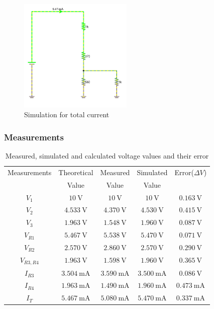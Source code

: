 \documentclass[letterpaper]{article}
\begin{document}
    \begin{figure}
    \centering
        \includegraphics[width=0.48\textwidth]{sims/Itot}
        \caption{Simulation for total current}
    \end{figure}
\subsubsection{Measurements}
\begin{table}[H]
    \centering
    \begin{tabular}{|c|c|c|c|c|}
    \hline
    Measurements & Theoretical & Measured & Simulated & Error($\Delta V$)\\
    & Value & Value & Value & \\\hline
    $V_1$ & $\SI{10}{\volt}$ & $\SI{10}{\volt}$ & $\SI{10}{\volt}$ & $\SI{0.163}{\volt}$\\\hline
    $V_2$ & $\SI{4.533}{\volt}$ & $\SI{4.370}{\volt}$ & $\SI{4.530}{\volt}$ & $\SI{0.415}{\volt}$\\\hline
    $V_3$ & $\SI{1.963}{\volt}$ & $\SI{1.548}{\volt}$ & $\SI{1.960}{\volt}$ & $\SI{0.087}{\volt}$\\\hline
    $V_{R1}$ & $\SI{5.467}{\volt}$ & $\SI{5.538}{\volt}$ & $\SI{5.470}{\volt}$ & $\SI{0.071}{\volt}$\\\hline
    $V_{R2}$ & $\SI{2.570}{\volt}$ & $\SI{2.860}{\volt}$ & $\SI{2.570}{\volt}$ & $\SI{0.290}{\volt}$\\\hline
    $V_{R3,R4}$ & $\SI{1.963}{\volt}$ & $\SI{1.598}{\volt}$ & $\SI{1.960}{\volt}$ & $\SI{0.365}{\volt}$\\\hline
    $I_{R3}$ & $\SI{3.504}{\milli\ampere}$ & $\SI{3.590}{\milli\ampere}$ & $\SI{3.500}{\milli\ampere}$
    & $\SI{0.086}{\volt}$\\\hline
    $I_{R4}$ & $\SI{1.963}{\milli\ampere}$ & $\SI{1.490}{\milli\ampere}$ & $\SI{1.960}{\milli\ampere}$
    & $\SI{0.473}{\milli\ampere}$\\\hline
    $I_T$ & $\SI{5.467}{\milli\ampere}$ & $\SI{5.080}{\milli\ampere}$ & $\SI{5.470}{\milli\ampere}$ &
    $\SI{0.337}{\milli\ampere}$\\\hline
    \end{tabular}
    \label{tab:1}
    \caption{Measured, simulated and calculated voltage values and their error}
\end{table}
\end{document}
